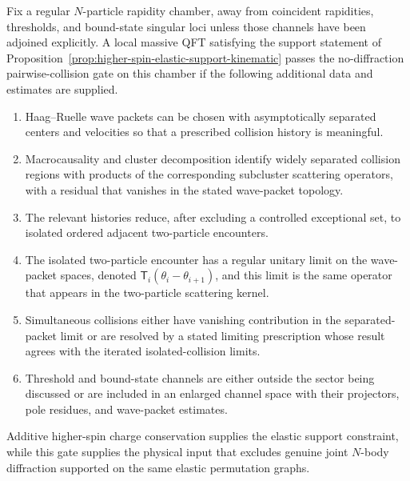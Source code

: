 \begin{definition}
\label{def:no-diffraction-pairwise-collision-gate}
Fix a regular \(N\)-particle rapidity chamber, away from coincident rapidities,
thresholds, and bound-state singular loci unless those channels have been
adjoined explicitly.  A local massive QFT satisfying the support statement of
Proposition~\ref{prop:higher-spin-elastic-support-kinematic} passes the
no-diffraction pairwise-collision gate on this chamber if the following
additional data and estimates are supplied.
\begin{enumerate}[label=\textnormal{(\roman*)}]
\item Haag--Ruelle wave packets can be chosen with asymptotically separated
  centers and velocities so that a prescribed collision history is meaningful.
\item Macrocausality and cluster decomposition identify widely separated
  collision regions with products of the corresponding subcluster scattering
  operators, with a residual that vanishes in the stated wave-packet topology.
\item The relevant histories reduce, after excluding a controlled exceptional
  set, to isolated ordered adjacent two-particle encounters.
\item The isolated two-particle encounter has a regular unitary limit on the
  wave-packet spaces, denoted
  \(\mathsf T_i(\theta_i-\theta_{i+1})\), and this limit is the same operator
  that appears in the two-particle scattering kernel.
\item Simultaneous collisions either have vanishing contribution in the
  separated-packet limit or are resolved by a stated limiting prescription whose
  result agrees with the iterated isolated-collision limits.
\item Threshold and bound-state channels are either outside the sector being
  discussed or are included in an enlarged channel space with their projectors,
  pole residues, and wave-packet estimates.
\end{enumerate}
Additive higher-spin charge conservation supplies the elastic support
constraint, while this gate supplies the physical input that excludes genuine
joint \(N\)-body diffraction supported on the same elastic permutation graphs.
\end{definition}

